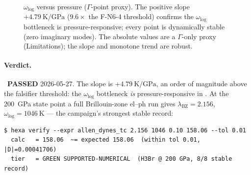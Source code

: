 \begin{figure}[h]
\centering
{}
\caption{ $\omega_{\log}$ versus pressure ($\Gamma$-point proxy).
The positive slope $+\SI{4.79}{\kelvin\per\giga\pascal}$ ($9.6\times$ the
F-N6-4 threshold) confirms the $\omega_{\log}$ bottleneck is
pressure-responsive; every point is dynamically stable (zero imaginary
modes). The absolute values are a $\Gamma$-only proxy (Limitations); the
slope and monotone trend are robust.}
\label{fig:pscan}
\end{figure}

\paragraph{Verdict.}
\tierGreen\ \textbf{PASSED} 2026-05-27. The slope is
$+\SI{4.79}{\kelvin\per\giga\pascal}$, an order of magnitude above the
falsifier threshold: the $\omega_{\log}$ bottleneck \emph{is}
pressure-responsive in . At the \SI{200}{\giga\pascal} state point a
full Brillouin-zone el--ph run gives $\lambda_{\mathrm{BZ}} = 2.156$,
$\omega_{\log} = \SI{1046}{\kelvin}$ --- the campaign's strongest stable
record:

\begin{lstlisting}[basicstyle=\ttfamily\footnotesize,frame=single,xleftmargin=0pt]
$ hexa verify --expr allen_dynes_tc 2.156 1046 0.10 158.06 --tol 0.01
  calc   = 158.06  ~= expected 158.06  (within tol 0.01, |D|=0.00041706)
  tier   = GREEN SUPPORTED-NUMERICAL  (H3Br @ 200 GPa, 8/8 stable record)
\end{lstlisting}

